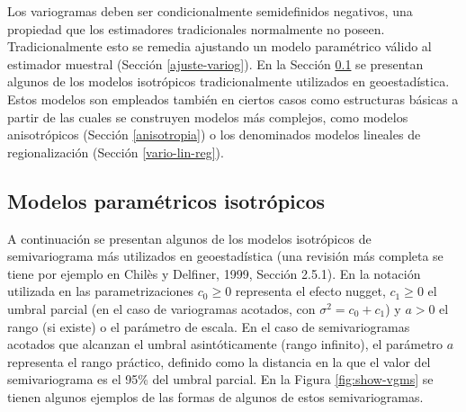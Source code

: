 \documentclass[
  spanish,
]{book}
\theoremstyle{break}
\theoremstyle{definition}
\theoremstyle{definition}
\theoremstyle{definition}
\theoremstyle{definition}
\theoremstyle{remark}
\begin{document}
Los variogramas deben ser condicionalmente semidefinidos negativos, una propiedad que los estimadores tradicionales normalmente no poseen.
Tradicionalmente esto se remedia ajustando un modelo paramétrico válido al estimador muestral (Sección \ref{ajuste-variog}).
En la Sección \ref{modelos-parametricos} se presentan algunos de los modelos isotrópicos tradicionalmente utilizados en geoestadística.
Estos modelos son empleados también en ciertos casos como estructuras básicas a partir de las cuales se construyen modelos más complejos, como modelos anisotrópicos (Sección \ref{anisotropia}) o los denominados modelos lineales de regionalización (Sección \ref{vario-lin-reg}).

\hypertarget{modelos-parametricos}{%
\subsection{Modelos paramétricos isotrópicos}\label{modelos-parametricos}}

A continuación se presentan algunos de los modelos isotrópicos de semivariograma más utilizados en geoestadística (una revisión más completa se tiene por ejemplo en Chilès y Delfiner, 1999, Sección 2.5.1).
En la notación utilizada en las parametrizaciones \(c_0 \geq 0\) representa el efecto nugget, \(c_1 \geq 0\) el umbral parcial (en el caso de variogramas acotados, con \(\sigma^2= c_0 + c_1\)) y \(a>0\) el rango (si existe) o el parámetro de escala.
En el caso de semivariogramas acotados que alcanzan el umbral asintóticamente (rango infinito), el parámetro \(a\) representa el rango práctico, definido como la distancia en la que el valor del semivariograma es el 95\% del umbral parcial.
En la Figura \ref{fig:show-vgms} se tienen algunos ejemplos de las formas de algunos de
estos semivariogramas.
\end{document}
